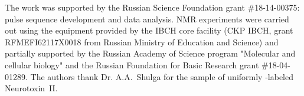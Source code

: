 \documentclass[twocolumn]{svjour3}           %
\begin{document}
\begin{acknowledgements}
The work was supported by the Russian Science Foundation grant 
\#18-14-00375: pulse sequence development and data analysis.  
{NMR} experiments were carried out using the equipment 
provided by the {IBCH} core facility ({CKP} {IBCH}, grant 
{RFMEFI62117X0018} from Russian Ministry of Education and Science) 
and partially supported by the 
Russian Academy of Science program "Molecular and cellular biology" and the Russian Foundation for Basic Research grant \#18-04-01289. 
The authors thank Dr. A.A.~Shul\-ga for the sample of 
uniformly \nclab-labeled Neurotoxin~II. 
\end{acknowledgements}



%

%
%
\end{document}
